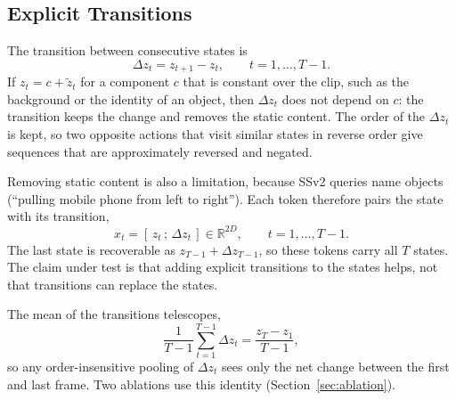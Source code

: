 \documentclass[lettersize,journal]{IEEEtran}
\begin{document}
\subsection{Explicit Transitions}
The transition between consecutive states is
\begin{equation}
\label{eq:transition}
\Delta z_t = z_{t+1} - z_t, \qquad t = 1,\dots,T-1.
\end{equation}
If $z_t = c + \tilde z_t$ for a component $c$ that is constant over the clip,
such as the background or the identity of an object, then $\Delta z_t$ does not
depend on $c$: the transition keeps the change and removes the static content.
The order of the $\Delta z_t$ is kept, so two opposite actions that visit
similar states in reverse order give sequences that are approximately reversed
and negated.

Removing static content is also a limitation, because SSv2 queries name objects
(``pulling mobile phone from left to right''). Each token therefore pairs the
state with its transition,
\begin{equation}
\label{eq:token}
x_t = [\,z_t\,;\,\Delta z_t\,] \in \mathbb{R}^{2D}, \qquad t = 1,\dots,T-1.
\end{equation}
The last state is recoverable as $z_{T-1}+\Delta z_{T-1}$, so these tokens
carry all $T$ states. The claim under test is that adding explicit transitions
to the states helps, not that transitions can replace the states.

The mean of the transitions telescopes,
\begin{equation}
\label{eq:telescope}
\frac{1}{T-1}\sum_{t=1}^{T-1}\Delta z_t = \frac{z_T - z_1}{T-1},
\end{equation}
so any order-insensitive pooling of $\Delta z_t$ sees only the net change
between the first and last frame. Two ablations use this identity
(Section~\ref{sec:ablation}).
\end{document}
